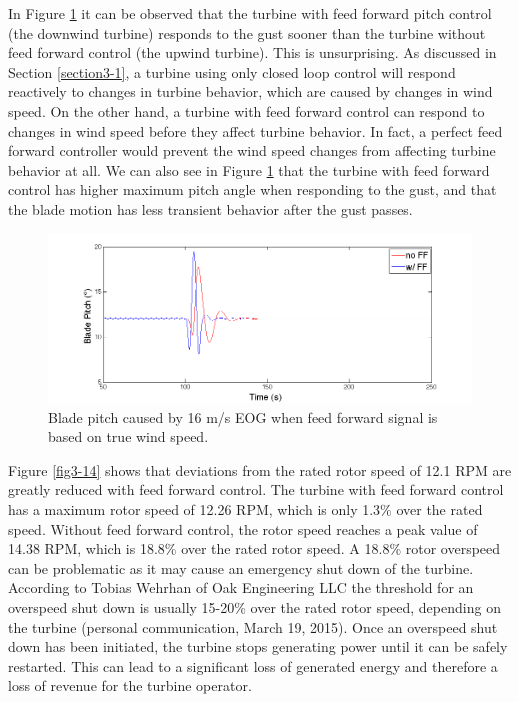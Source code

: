 In Figure \ref{fig3-13} it can be observed that the turbine with feed forward pitch control (the downwind turbine) responds to the gust sooner than the turbine without feed forward control (the upwind turbine). This is unsurprising. As discussed in Section \ref{section3-1}, a turbine using only closed loop control will respond reactively to changes in turbine behavior, which are caused by changes in wind speed. On the other hand, a turbine with feed forward control can respond to changes in wind speed before they affect turbine behavior. In fact, a perfect feed forward controller would prevent the wind speed changes from affecting turbine behavior at all. We can also see in Figure \ref{fig3-13} that the turbine with feed forward control has  higher maximum pitch angle when responding to the gust, and that the blade motion has less transient behavior after the gust passes.

\begin{figure}[htb]
	\centering
		\includegraphics[width = \linewidth]{Figures/ch3Figures/fig3-13.png}
		
	\caption{Blade pitch caused by 16 m/s EOG when feed forward signal is based on true wind speed.}
	\label{fig3-13}
\end{figure}

Figure \ref{fig3-14} shows that deviations from the rated rotor speed of 12.1 RPM are greatly reduced with feed forward control. The turbine with feed forward control has a maximum rotor speed of 12.26 RPM, which is only 1.3$\%$ over the rated speed. Without feed forward control, the rotor speed reaches a peak value of 14.38 RPM, which is 18.8$\%$ over the rated rotor speed. A 18.8$\%$ rotor overspeed can be problematic as it may cause an emergency shut down of the turbine. According to Tobias Wehrhan of Oak Engineering LLC the threshold for an overspeed shut down is usually 15-20$\%$ over the rated rotor speed, depending on the turbine (personal communication, March 19, 2015). Once an overspeed shut down has been initiated, the turbine stops generating power until it can be safely restarted. This can lead to a significant loss of generated energy and therefore a loss of revenue for the turbine operator.

